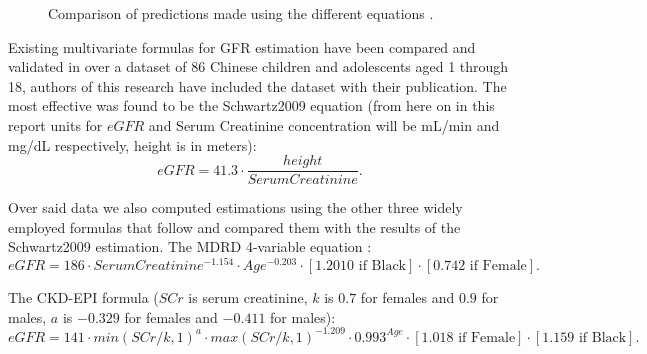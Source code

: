 \documentclass[10pt,final]{siamltex}
\begin{document}
\begin{figure}[ht]
  \centering
  \caption{Comparison of predictions made using the different equations \cite{gfr}.}
  \label{equations}
\end{figure}

Existing multivariate formulas for GFR estimation have been compared and validated in \cite{gfr} over a dataset of 86 Chinese children and adolescents aged 1 through 18, authors of this research have included the dataset with their publication. The most effective was found to be the Schwartz2009 equation \cite{schwartz} (from here on in this report units for $eGFR$ and Serum Creatinine concentration will be mL/min and mg/dL respectively, height is in meters):
$$ eGFR = 41.3 \cdot \frac{height}{Serum Creatinine}.$$

Over said data we also computed estimations using the other three widely employed formulas that follow and compared them with the results of the Schwartz2009 estimation. The MDRD 4-variable equation \cite{MDRD}:
$$ eGFR = 186 \cdot Serum Creatinine^{-1.154}\cdot Age^{-0.203} \cdot [1.2010 \text{ if Black}] \cdot [0.742 \text{ if Female}].$$

The CKD-EPI formula \cite{ckdepi} ($SCr$ is serum creatinine, $k$ is $0.7$ for females and $0.9$ for males, $a$ is $−0.329$ for females and $−0.411$ for males):
$$ eGFR = 141 \cdot min(SCr/k,1)^a\cdot max(SCr/k,1)^{-1.209}\cdot0.993^{Age}\cdot [1.018 \text{ if Female}] \cdot [1.159 \text{ if Black}].$$
\end{document}
